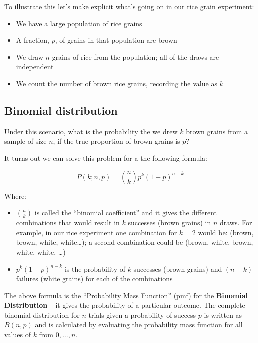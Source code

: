 \documentclass[]{book}
\providecommand{\tightlist}{%
  \setlength{\itemsep}{0pt}\setlength{\parskip}{0pt}}
\theoremstyle{definition}
\theoremstyle{definition}
\theoremstyle{definition}
\theoremstyle{remark}
\begin{document}
To illustrate this let's make explicit what's going on in our rice grain
experiment:

\begin{itemize}
\tightlist
\item
  We have a large population of rice grains
\item
  A fraction, \(p\), of grains in that population are brown
\item
  We draw \(n\) grains of rice from the population; all of the draws are
  independent
\item
  We count the number of brown rice grains, recording the value as \(k\)
\end{itemize}

\hypertarget{binomial-distribution}{%
\subsection{Binomial distribution}\label{binomial-distribution}}

Under this scenario, what is the probability the we drew \(k\) brown
grains from a sample of size \(n\), if the true proportion of brown
grains is \(p\)?

It turns out we can solve this problem for a the following formula:

\[
P(k; n, p) = {n \choose k} p^k (1-p)^{n-k}
\]

Where:

\begin{itemize}
\tightlist
\item
  \({n \choose k}\) is called the ``binomial coefficient'' and it gives
  the different combinations that would result in \(k\) successes (brown
  grains) in \(n\) draws. For example, in our rice experiment one
  combination for \(k=2\) would be: (brown, brown, white,
  white\ldots{}); a second combination could be (brown, white, brown,
  white, white, \ldots{})
\item
  \(p^k(1-p)^{n-k}\) is the probability of \(k\) successes (brown
  grains) and \((n-k)\) failures (white grains) for each of the
  combinations
\end{itemize}

The above formula is the ``Probability Mass Function'' (pmf) for the
\textbf{Binomial Distribution} -- it gives the probability of a
particular outcome. The complete binomial distribution for \(n\) trials
given a probability of success \(p\) is written as \(B(n,p)\) and is
calculated by evaluating the probability mass function for all values of
\(k\) from \(0,\ldots,n\).
\end{document}
